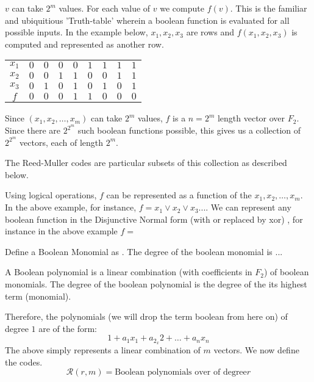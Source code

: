 \documentclass{article}
\newcommand{\RM}[2]{\ensuremath{\mathcal{R}(#1,#2)}}
\begin{document}
$v$ can take $2^m$ values. For each value of $v$ we compute $f(v)$. This is the familiar and ubiquitious 'Truth-table' wherein a boolean function is evaluated for all possible inputs.
In the example below, $x_1, x_2, x_3$ are rows and $f(x_1, x_2, x_3)$ is computed and represented as another row. 
\begin {center}
\begin{tabular}{|c|c|c|c|c|c|c|c|c|}
$x_1$ & $0$ & $0$ & $0$ & $0$ & $1$ & $1$ & $1$ & $1$ \\
$x_2$ & $0$ & $0$ & $1$ & $1$ & $0$ & $0$ & $1$ & $1$ \\
$x_3$ & $0$ & $1$ & $0$ & $1$ & $0$ & $1$ & $0$ & $1$ \\
$f$   & $0$ & $0$ & $0$ & $1$ & $1$ & $0$ & $0$ & $0$ \\

\end{tabular}
\end{center} 

Since $(x_1,x_2,\ldots,x_m)$ can take $2^m$ values, $f$ is a $n=2^m$ length vector over $F_2$. Since there are $2^2^m$ such boolean functions possible, this gives us a collection of  $2^2^m$ vectors, each of length $2^m$.
 
The Reed-Muller codes are particular subsets of this collection as described below.

Using logical operations, $f$ can be represented as a function of the $x_1, x_2, \ldots , x_m$. In the above example, for instance, $f = x_1 \vee x_2 \vee x_3 ... $. We can represent any boolean function in the Disjunctive Normal form (with or replaced by xor) \cite{Problem2}, for instance in the above example $f = $

Define a Boolean Monomial as .
The degree of the boolean monomial is ...

A Boolean polynomial is a linear combination (with coefficients in $F_2$) of boolean monomials. The degree of the boolean polynomial is the degree of the its highest term (monomial).

Therefore, the polynomials (we will drop the term boolean from here on) of degree $1$ are of the form:
\begin{equation}
 1+a_1x_1+a_2_x2+\ldots+a_nx_n
\end{equation}
The above simply represents a linear combination of $m$ vectors.
We now define the \rm codes.
\begin{equation}

\RM{r}{m} = \text{Boolean polynomials over of degree} r
\end{equation}
\end{document}
